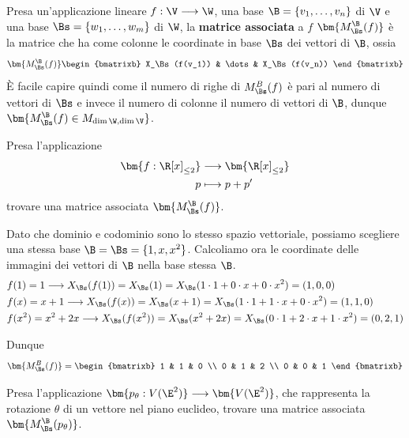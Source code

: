 \documentclass[11pt, a4paper, titlepage, oneside]{scrbook}
\begin{document}
\begin{Definizione}
\label{def-matrice-associata}
Presa un'applicazione lineare $f: \V \longrightarrow \W$, una base $\B = \{v_1, \ldots, v_n\}$ di $\V$ e una base $\Bs = \{w_1, \ldots, w_m\}$ di $\W$, la \textbf{matrice associata} a $f$ $\bm{M_\Bs^\B(f)}$ è la matrice che ha come colonne le coordinate in base $\Bs$ dei vettori di $\B$, ossia 
\[
\bm{M_\Bs^\B(f)}
\begin{bmatrixb}
X_\Bs(f(v_1)) & \dots & X_\Bs(f(v_n))
\end{bmatrixb}
\]
È facile capire quindi come il numero di righe di $M_\Bs^B(f)$ è pari al numero di vettori di $\Bs$ e invece il numero di colonne il numero di vettori di $\B$, dunque $\bm{M_\Bs^\B(f) \in M_{\dim \W, \dim \V}}$.
\end{Definizione}

\Esempi \nopagebreak

Presa l'applicazione
\begin{align*}
\bm{f: \R[x]_{\leq 2}} &\longrightarrow \bm{\R[x]_{\leq 2}} \\
 p &\longmapsto p + p'
\end{align*}
trovare una matrice associata $\bm{M_\Bs^\B(f)}$. \nopagebreak

Dato che dominio e codominio sono lo stesso spazio vettoriale, possiamo scegliere una stessa base $\B = \Bs = \{1, x, x^2\}$. Calcoliamo ora le coordinate delle immagini dei vettori di $\B$ nella base stessa $\B$.
\begin{align*}
&f(1) = 1 \longrightarrow X_\Bs(f(1)) = X_\Bs(1) = X_\Bs(1 \cdot 1 + 0 \cdot x + 0 \cdot x^2) = (1,0,0) \\
&f(x) = x+1 \longrightarrow X_\Bs(f(x)) = X_\Bs(x+1) = X_\Bs(1 \cdot 1 + 1 \cdot x + 0 \cdot x^2) = (1,1,0) \\
&f(x^2) = x^2+2x \longrightarrow X_\Bs(f(x^2)) = X_\Bs(x^2+2x) = X_\Bs(0 \cdot 1 + 2 \cdot x + 1 \cdot x^2) = (0,2,1) \\
\end{align*} 

Dunque 
\[ \bm{M_\Bs^B(f)} = 
\begin{bmatrixb}
1 & 1 & 0  \\
0 & 1 & 2 \\
0 & 0 & 1 
\end{bmatrixb}
\]

\Separatore

Presa l'applicazione $\bm{p_\theta : V(\E^2)} \longrightarrow \bm{V(\E^2)}$, che rappresenta la rotazione $\theta$ di un vettore nel piano euclideo, trovare una matrice associata $\bm{M_\Bs^\B(p_\theta)}$. \nopagebreak
\end{document}
